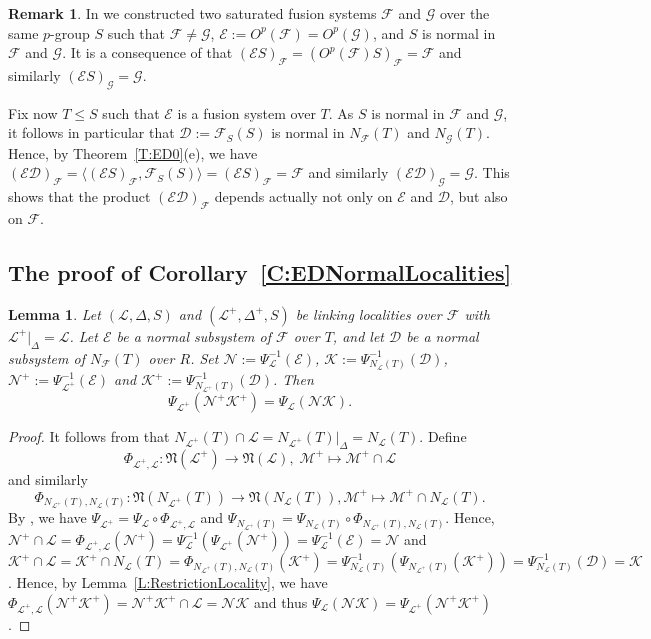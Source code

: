 \documentclass[reqno,11pt]{amsart}
\numberwithin{equation}{section}
\newtheorem{lemma}[theorem]{Lemma}
\theoremstyle{definition}
\newtheorem{remark}[equation]{Remark}
\newcommand{\F}{\mathcal{F}}
\newcommand{\E}{\mathcal{E}}
\newcommand{\G}{\mathcal{G}}
\renewcommand{\L}{\mathcal{L}}
\newcommand{\M}{\mathcal{M}}
\newcommand{\N}{\mathcal{N}}
\newcommand{\K}{\mathcal{K}}
\newcommand{\fN}{\mathfrak{N}}
\newcommand{\mD}{\mathcal{D}}
\def \<{\langle }
\def \>{\rangle }
\begin{document}
\begin{remark}\label{R:Example}
In \cite[Example~7.4]{Henke:2013} we constructed two saturated fusion systems $\F$ and $\G$ over the same $p$-group $S$ such that $\F\neq\G$, $\E:=O^p(\F)=O^p(\G)$, and $S$ is normal in $\F$ and $\G$. It is a consequence of \cite[Theorem~1]{Henke:2013} that $(\E S)_\F=(O^p(\F)S)_\F=\F$ and similarly $(\E S)_\G=\G$.

\smallskip

Fix now $T\leq S$ such that $\E$ is a fusion system over $T$. As $S$ is normal in $\F$ and $\G$, it follows in particular that $\mD:=\F_S(S)$ is normal in $N_\F(T)$ and $N_\G(T)$. Hence, by Theorem~\ref{T:ED0}(e), we have $(\E\mD)_\F=\<(\E S)_\F,\F_S(S)\>=(\E S)_\F=\F$ and similarly $(\E\mD)_\G=\G$. This shows that the product $(\E\mD)_\F$ depends actually not only on $\E$ and $\mD$, but also on $\F$.
\end{remark}



\subsection{The proof of Corollary~\ref{C:EDNormalLocalities}}


\begin{lemma}\label{L:RestrictionPsiL}
 Let $(\L,\Delta,S)$ and $(\L^+,\Delta^+,S)$ be linking localities over $\F$ with $\L^+|_\Delta=\L$. Let $\E$ be a normal subsystem of $\F$ over $T$, and let $\mD$ be a normal subsystem of $N_\F(T)$ over $R$. Set $\N:=\Psi_\L^{-1}(\E)$, $\K:=\Psi_{N_\L(T)}^{-1}(\mD)$, $\N^+:=\Psi_{\L^+}^{-1}(\E)$ and $\K^+:=\Psi_{N_{\L^+}(T)}^{-1}(\mD)$. Then
 \[\Psi_{\L^+}(\N^+\K^+)=\Psi_\L(\N\K).\]
\end{lemma}

\begin{proof}
It follows from \cite[Lemma~2.23(b)]{Henke:2020} that $N_{\L^+}(T)\cap\L=N_{\L^+}(T)|_\Delta=N_\L(T)$.
Define
\[\Phi_{\L^+,\L}\colon \fN(\L^+)\rightarrow \fN(\L),\;\M^+\mapsto \M^+\cap\L\]
and similarly
\[\Phi_{N_{\L^+}(T),N_\L(T)}\colon\fN(N_{\L^+}(T))\rightarrow \fN(N_\L(T)),\M^+\mapsto\M^+\cap N_\L(T).\]
By \cite[Theorem~5.14(c)]{Chermak/Henke}, we have $\Psi_{\L^+}=\Psi_\L\circ\Phi_{\L^+,\L}$ and $\Psi_{N_{\L^+}(T)}=\Psi_{N_\L(T)}\circ \Phi_{N_{\L^+}(T),N_\L(T)}$. Hence, $\N^+\cap\L=\Phi_{\L^+,\L}(\N^+)=\Psi_\L^{-1}(\Psi_{\L^+}(\N^+))=\Psi_\L^{-1}(\E)=\N$ and $\K^+\cap \L=\K^+\cap N_\L(T)=\Phi_{N_{\L^+}(T),N_\L(T)}(\K^+)=\Psi_{N_\L(T)}^{-1}(\Psi_{N_{\L^+}(T)}(\K^+))=\Psi_{N_\L(T)}^{-1}(\mD)=\K$. Hence, by Lemma~\ref{L:RestrictionLocality}, we have $\Phi_{\L^+,\L}(\N^+\K^+)=\N^+\K^+\cap\L=\N\K$ and thus $\Psi_\L(\N\K)=\Psi_{\L^+}(\N^+\K^+)$. 
\end{proof}
\end{document}

